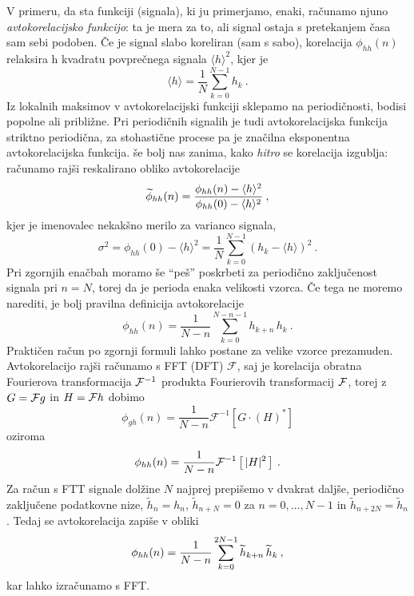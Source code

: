 \documentclass[slovene,11pt,a4paper]{article}
\begin{document}
V primeru, da sta funkciji (signala), ki ju primerjamo, enaki,
računamo njuno {\sl avtokorelacijsko funkcijo\/}: ta je mera
za to, ali signal ostaja s pretekanjem časa sam sebi podoben.
Če je signal slabo koreliran (sam s sabo), korelacija $\phi_{hh}(n)$
relaksira h kvadratu povprečnega signala $\langle h\rangle^2$, kjer je
\begin{equation*}
\langle h\rangle = \frac{1}{N} \sum_{k=0}^{N-1} h_k \>.  
\end{equation*}
Iz lokalnih maksimov v avtokorelacijski funkciji sklepamo
na periodičnosti, bodisi popolne ali približne.
Pri periodičnih signalih je tudi avtokorelacijska funkcija
striktno periodična, za stohastične procese pa je značilna
eksponentna avtokorelacijska funkcija.
še bolj nas zanima, kako {\sl hitro\/} se korelacija izgublja:
računamo rajši reskalirano obliko avtokorelacije
\begin{equation*}
\widetilde{\phi}_{hh}(n) = 
{ \phi_{hh}(n) - \langle h\rangle^2 \over \phi_{hh}(0) - \langle h\rangle^2 } \>,  
\end{equation*}
kjer je imenovalec nekakšno merilo za  varianco signala,
\begin{equation*}
\sigma^2 = \phi_{hh}(0) - \langle h\rangle^2 
= \frac{1}{N} \sum_{k=0}^{N-1} \left( h_k - \langle h\rangle \right)^2 \>.  
\end{equation*}
Pri zgornjih enačbah moramo še ``peš'' poskrbeti za periodično
zaključenost signala pri $n=N$, torej da je perioda enaka velikosti
vzorca.  Če tega ne moremo narediti, je bolj pravilna definicija
avtokorelacije
\begin{equation*}
\phi_{hh}(n)= \frac{1}{N-n}\sum_{k=0}^{N-n-1} h_{k+n}\, h_k \>.  
\end{equation*}
Praktičen račun po zgornji formuli lahko postane za velike
vzorce prezamuden.  Avtokorelacijo rajši računamo s FFT (DFT) $\mathcal{F}$,
saj je korelacija obratna Fourierova transformacija ${\cal F}^{-1}$
produkta Fourierovih transformacij ${\cal F}$, torej z $G={\cal F}g$ in $H={\cal F}h$ dobimo
\begin{equation*}
\phi_{gh}(n) = \frac{1}{N-n}\mathcal{F}^{-1} \left[ G \cdot (H)^\ast \right]
\end{equation*}
oziroma
\begin{equation*}
  \phi_{hh}(n) = \frac{1}{N-n}{\cal F}^{-1} \left[ \, | H |^2 \, \right] \>.
\end{equation*}
Za račun s FTT signale dolžine $N$ najprej prepišemo v dvakrat
daljše, periodično zaključene podatkovne nize, $\widetilde{h}_n = h_n$,
$\widetilde{h}_{n+N} = 0$ za $n = 0, \ldots, N-1$
in $\widetilde{h}_{n+2N} = \widetilde{h}_{n}$.
Tedaj se avtokorelacija zapiše v obliki
\begin{equation*}
\phi_{hh}(n)={1\over N-n}\sum_{k=0}^{2N-1}\widetilde{h}_{k+n}\,\widetilde{h}_k \>,  
\end{equation*}
kar lahko izračunamo s FFT.
\end{document}
